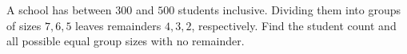 A school has between $300$ and $500$ students inclusive. Dividing them into groups of sizes $7,6,5$ leaves remainders $4,3,2$, respectively. Find the student count and all possible equal group sizes with no remainder.
